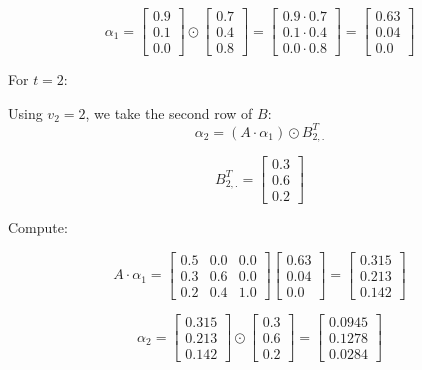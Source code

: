 \documentclass{article}
\begin{document}
\[
\alpha_1 = 
\begin{bmatrix} 
0.9 \\ 0.1 \\ 0.0 
\end{bmatrix} \odot 
\begin{bmatrix} 
0.7 \\ 0.4 \\ 0.8
\end{bmatrix} = 
\begin{bmatrix} 
0.9 \cdot 0.7 \\ 0.1 \cdot 0.4 \\ 0.0 \cdot 0.8 
\end{bmatrix} = 
\begin{bmatrix} 
0.63 \\ 0.04 \\ 0.0 
\end{bmatrix}
\]

For \( t = 2 \):

Using \( v_2 = 2 \), we take the second row of \( B \):
\[
\alpha_2 = (A \cdot \alpha_1) \odot B_{2,.}^T
\]


\[
B_{2,.}^T = 
\begin{bmatrix} 
0.3 \\ 0.6 \\ 0.2
\end{bmatrix}
\]

Compute:

\[
A \cdot \alpha_1 =
\begin{bmatrix} 
0.5 & 0.0 & 0.0 \\
0.3 & 0.6 & 0.0 \\
0.2 & 0.4 & 1.0
\end{bmatrix}
\begin{bmatrix} 
0.63 \\ 0.04 \\ 0.0
\end{bmatrix}
=
\begin{bmatrix} 
0.315 \\ 0.213 \\ 0.142
\end{bmatrix}
\]


\[
\alpha_2 = 
\begin{bmatrix} 
0.315 \\ 0.213 \\ 0.142
\end{bmatrix} \odot 
\begin{bmatrix} 
0.3 \\ 0.6 \\ 0.2
\end{bmatrix}
=
\begin{bmatrix} 
0.0945 \\ 0.1278 \\ 0.0284
\end{bmatrix}
\]
\end{document}
